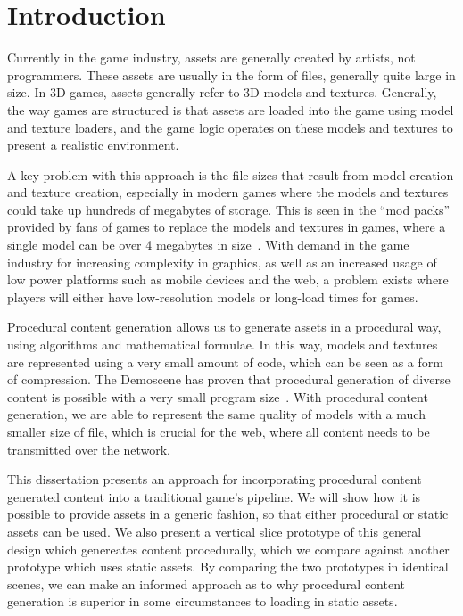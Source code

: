 \chapter{Introduction}
Currently in the game industry, assets are generally created by artists, not programmers.
These assets are usually in the form of files, generally quite large in size.
In 3D games, assets generally refer to 3D models and textures.
Generally, the way games are structured is that assets are loaded into the game using model and texture loaders, and the game logic operates on these models and textures to present a realistic environment.

A key problem with this approach is the file sizes that result from model creation and texture creation, especially in modern games where the models and textures could take up hundreds of megabytes of storage. 
This is seen in the ``mod packs'' provided by fans of games to replace the models and textures in games, where a single model can be over 4 megabytes in size~\cite{web:oblivionmodpack}.
With demand in the game industry for increasing complexity in graphics, as well as an increased usage of low power platforms such as mobile devices and the web, a problem exists where players will either have low-resolution models or long-load times for games.

Procedural content generation allows us to generate assets in a procedural way, using algorithms and mathematical formulae.
In this way, models and textures are represented using a very small amount of code, which can be seen as a form of compression.
The Demoscene has proven that procedural generation of diverse content is possible with a very small program size~\cite{web:demoscene4k}.
With procedural content generation, we are able to represent the same quality of models with a much smaller size of file, which is crucial for the web, where all content needs to be transmitted over the network.

This dissertation presents an approach for incorporating procedural content generated content into a traditional game's pipeline.
We will show how it is possible to provide assets in a generic fashion, so that either procedural or static assets can be used.
We also present a vertical slice prototype of this general design which genereates content procedurally, which we compare against another prototype which uses static assets.
By comparing the two prototypes in identical scenes, we can make an informed approach as to why procedural content generation is superior in some circumstances to loading in static assets.



